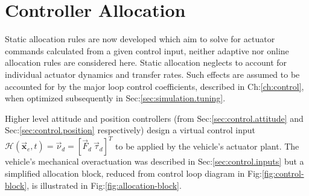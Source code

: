 \chapter{Controller Allocation}
\label{ch:allocation}
Static allocation rules are now developed which aim to solve for actuator commands calculated from a given control input, neither adaptive nor online allocation rules are considered here. Static allocation neglects to account for individual actuator dynamics and transfer rates. Such effects are assumed to be accounted for by the major loop control coefficients, described in Ch:\ref{ch:control}, when optimized subsequently in Sec:\ref{sec:simulation.tuning}.
\par
Higher level attitude and position controllers (from Sec:\ref{sec:control.attitude} and Sec:\ref{sec:control.position} respectively) design a virtual control input $\mathcal{H}(\vec{\mathbf{x}}_e,t)=\vec{\nu}_d=[\vec{F}_d~\vec{\tau}_d]^T$ to be applied by the vehicle's actuator plant. The vehicle's mechanical overactuation was described in Sec:\ref{sec:control.inputs} but a simplified allocation block, reduced from control loop diagram in Fig:\ref{fig:control-block}, is illustrated in Fig:\ref{fig:allocation-block}.
